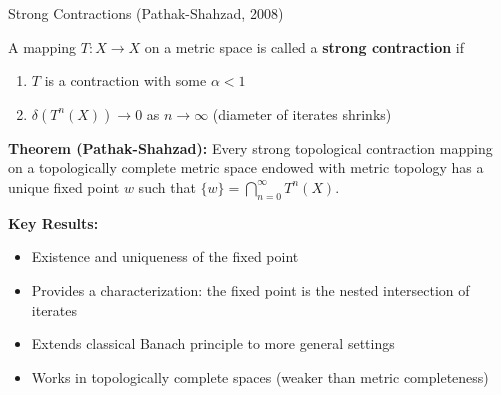 \documentclass[aspectratio=169,10pt]{beamer}
\begin{document}
\begin{frame}{Strong Contractions (Pathak-Shahzad, 2008)}
    \begin{definition}
        A mapping $T: X \to X$ on a metric space is called a \textbf{strong contraction} if
        \begin{enumerate}
            \item $T$ is a contraction with some $\alpha < 1$
            \item $\delta(T^n(X)) \to 0$ as $n \to \infty$ (diameter of iterates shrinks)
        \end{enumerate}
    \end{definition}

    \vspace{0.3cm}
    \textbf{Theorem (Pathak-Shahzad):} Every strong topological contraction mapping on a topologically complete metric space endowed with metric topology has a unique fixed point $w$ such that $\{w\} = \bigcap_{n=0}^\infty T^n(X)$.

    \vspace{0.3cm}
    \textbf{Key Results:}
    \begin{itemize}
        \item Existence and uniqueness of the fixed point
        \item Provides a characterization: the fixed point is the nested intersection of iterates
        \item Extends classical Banach principle to more general settings
        \item Works in topologically complete spaces (weaker than metric completeness)
    \end{itemize}
\end{frame}
\end{document}
